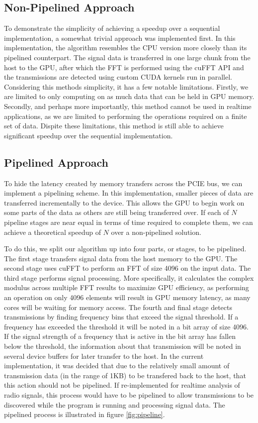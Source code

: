 \documentclass[conference]{IEEEtran}
\begin{document}
\subsection{Non-Pipelined Approach}

To demonstrate the simplicity of achieving a speedup over a sequential implementation,
a somewhat trivial approach was implemented first. In this implementation, the algorithm
resembles the CPU version more closely than its pipelined counterpart. The signal data
is transferred in one large chunk from the host to the GPU, after which the FFT
is performed using the cuFFT API and the transmissions are detected using custom
CUDA kernels run in parallel. Considering this methods simplicity, it has a few notable
limitations. Firstly, we are limited to only computing on as much data that can be
held in GPU memory. Secondly, and perhaps more importantly, this method cannot be used
in realtime applications, as we are limited to performing the operations required
on a finite set of data. Dispite these limitations, this method is still able to 
achieve significant speedup over the sequential implementation.

\subsection{Pipelined Approach}

To hide the latency created by memory transfers across the PCIE bus, we can implement
a pipelining scheme. In this implementation, smaller pieces of data are transferred
incrementally to the device. This allows the GPU to begin work on some parts of 
the data as others are still being transferred over. If each of $N$ pipeline stages are
near equal in terms of time required to complete them, we can achieve a theoretical
speedup of $N$ over a non-pipelined solution. 

To do this, we split our algorithm up into four parts, or stages, to be pipelined.
The first stage transfers signal data from the host memory to the GPU. The second 
stage uses cuFFT to perform an FFT of size 4096 on the input data. The third stage performs
signal processing. More specifically, it calculates the complex modulus across
multiple FFT results to maximize GPU efficiency, as performing an operation on only
4096 elements will result in GPU memory latency, as many cores will be waiting for
memory access. The fourth and final stage detects transmissions by finding frequency
bins that exceed the signal threshold. If a frequency has exceeded the threshold it
will be noted in a bit array of size 4096. If the signal strength of a frequency that 
is active in the bit array has fallen below the threshold, the information about that
transmission will be noted in several device buffers for later transfer to the host.
In the current implementation, it was decided that due to the relatively small amount
of transmission data (in the range of 1KB) to be transfered back to the host, that
this action should not be pipelined. If re-implemented for realtime analysis of radio
signals, this process would have to be pipelined to allow transmissions to be
discovered while the program is running and processing signal data. The pipelined
process is illustrated in figure \ref{fig:pipeline}. 
\end{document}
